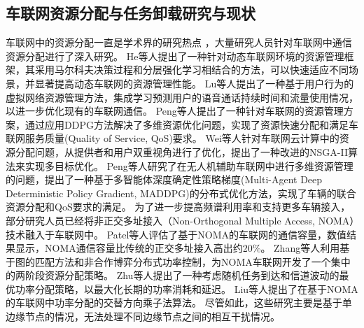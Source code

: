 \subsection{车联网资源分配与任务卸载研究与现状}

车联网中的资源分配一直是学术界的研究热点 \cite{noor-a-rahim2022a}，大量研究人员针对车联网中通信资源分配进行了深入研究。
He等人\cite{he2022meta}提出了一种针对动态车联网环境的资源管理框架，其采用马尔科夫决策过程和分层强化学习相结合的方法，可以快速适应不同场景，并显著提高动态车联网的资源管理性能。
Lu等人\cite{lu2021user}提出了一种基于用户行为的虚拟网络资源管理方法，集成学习预测用户的语音通话持续时间和流量使用情况，以进一步优化现有的车联网通信。
Peng等人\cite{peng2020deep}提出了一种针对车联网的资源管理方案，通过应用DDPG方法解决了多维资源优化问题，实现了资源快速分配和满足车联网服务质量(Quality of Service, QoS)要求。
Wei等人\cite{wei2022multi}针对车联网云计算中的资源分配问题，从提供者和用户双重视角进行了优化，提出了一种改进的NSGA-II算法来实现多目标优化。
Peng等人\cite{peng2021multi}研究了在无人机辅助车联网中进行多维资源管理的问题，提出了一种基于多智能体深度确定性策略梯度(Multi-Agent Deep Deterministic Policy Gradient, MADDPG)的分布式优化方法，实现了车辆的联合资源分配和QoS要求的满足。
为了进一步提高频谱利用率和支持更多车辆接入，部分研究人员已经将非正交多址接入（Non-Orthogonal Multiple Access, NOMA）技术融入于车联网中。
Patel等人\cite{patel2021performance}评估了基于NOMA的车联网的通信容量，数值结果显示，NOMA通信容量比传统的正交多址接入高出约20\%。
Zhang等人\cite{zhang2021centralized}利用基于图的匹配方法和非合作博弈分布式功率控制，为NOMA车联网开发了一个集中的两阶段资源分配策略。
Zhu等人\cite{zhu2021decentralized}提出了一种考虑随机任务到达和信道波动的最优功率分配策略，以最大化长期的功率消耗和延迟。
Liu等人\cite{liu2019energy}提出了在基于NOMA的车联网中功率分配的交替方向乘子法算法。
尽管如此，这些研究主要是基于单边缘节点的情况，无法处理不同边缘节点之间的相互干扰情况。

